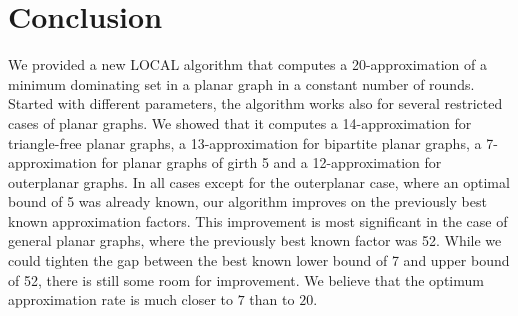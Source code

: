 
\section{Conclusion}

  We provided a new LOCAL algorithm that computes a
  20\hspace{1pt}-\hspace{1pt}approximation of
  a minimum dominating set in a planar graph in a constant number of
  rounds. Started with different parameters, the algorithm works also
  for several restricted cases of planar graphs. We showed that
  it computes a 14\hspace{1pt}-\hspace{1pt}approximation for
  triangle-free planar graphs, a 13\hspace{1pt}-\hspace{1pt}approximation
  for bipartite planar graphs, a 7\hspace{1pt}-\hspace{1pt}approximation
  for planar graphs of girth 5 and a 12\hspace{1pt}-\hspace{1pt}approximation
  for outerplanar graphs. In all cases except for the outerplanar case,
  where an optimal bound of 5 was already known, our algorithm
  improves on the previously best known approximation factors.
  This improvement is most significant in the case of general planar
  graphs, where the previously best known factor was 52.
  While we could tighten the gap between the best known lower bound of 7
  and upper bound of 52, there is still some room for improvement. We
  believe that the optimum approximation rate is much closer to $7$ than
  to $20$.
